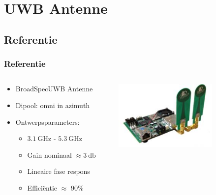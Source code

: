 \documentclass{beamer}
\begin{document}
\section{UWB Antenne}
\subsection{Referentie}
  \begin{frame}
  \frametitle{Referentie}
  \begin{columns}[c]
  \begin{column}{0.5\textwidth}
    \begin{itemize}
      \item BroadSpec\texttrademark  UWB Antenne 
      \item Dipool: omni in azimuth
      \item Ontwerpsparameters:
      \begin{itemize}
        \item $\SI{3.1}{\giga\hertz}$ - $\SI{5.3}{\giga\hertz}$
        \item Gain nominaal $\approx \SI{3}{\decibel}$ 
        \item Lineaire fase respons
        \item Effici\"entie $\approx$ 90\%
      \end{itemize}
    \end{itemize}
    \end{column}

    \begin{column}{0.5\textwidth}
    \centering
      \includegraphics[width=0.7\textwidth]{images/Pulson400UWB.jpg}
    \end{column}
    \end{columns}
  \end{frame}
\end{document}
